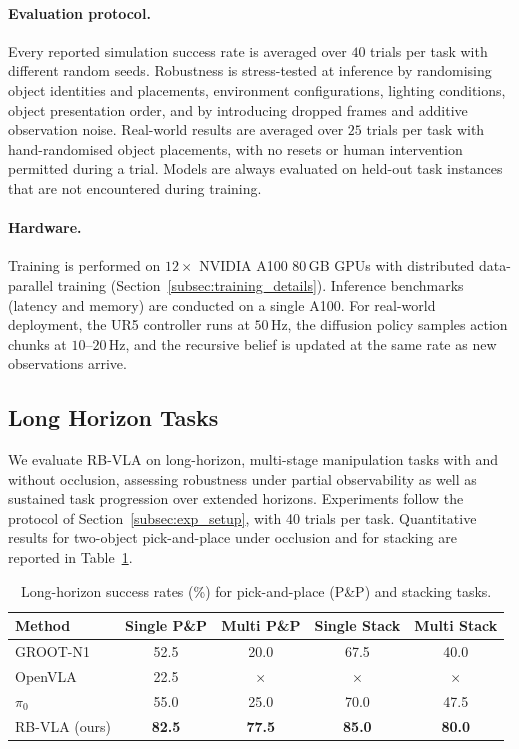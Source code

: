 \documentclass[12pt]{article}
\begin{document}
\paragraph{Evaluation protocol.} Every reported simulation success rate is averaged over $40$ trials per task with different random seeds. Robustness is stress-tested at inference by randomising object identities and placements, environment configurations, lighting conditions, object presentation order, and by introducing dropped frames and additive observation noise. Real-world results are averaged over $25$ trials per task with hand-randomised object placements, with no resets or human intervention permitted during a trial. Models are always evaluated on held-out task instances that are not encountered during training.

\paragraph{Hardware.} Training is performed on $12\times$ NVIDIA A100 80\,GB GPUs with distributed data-parallel training (Section~\ref{subsec:training_details}). Inference benchmarks (latency and memory) are conducted on a single A100. For real-world deployment, the UR5 controller runs at $50$\,Hz, the diffusion policy samples action chunks at $10$--$20$\,Hz, and the recursive belief is updated at the same rate as new observations arrive.

\subsection{Long Horizon Tasks}
We evaluate RB-VLA on long-horizon, multi-stage manipulation tasks with and without occlusion, assessing robustness under partial observability as well as sustained task progression over extended horizons. Experiments follow the protocol of Section~\ref{subsec:exp_setup}, with 40 trials per task. Quantitative results for two-object pick-and-place under occlusion and for stacking are reported in Table~\ref{tab:longhorizon}.

\begin{table}[h]
\centering
\caption{Long-horizon success rates (\%) for pick-and-place (P\&P) and stacking tasks.}
\label{tab:longhorizon}
\begin{tabular}{lcccc}
\hline
Method & Single P\&P & Multi P\&P & Single Stack & Multi Stack \\
\hline
GROOT-N1 & 52.5 & 20.0 & 67.5 & 40.0 \\
OpenVLA & 22.5 & $\times$ & $\times$ & $\times$ \\
$\pi_0$ & 55.0 & 25.0 & 70.0 & 47.5 \\
RB-VLA (ours) & \textbf{82.5} & \textbf{77.5} & \textbf{85.0} & \textbf{80.0} \\
\hline
\end{tabular}
\end{table}
\end{document}
